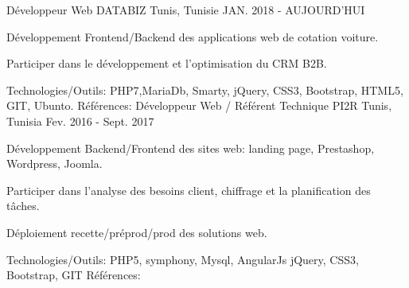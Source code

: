 \begin{cventries}
  \techentries
    {Développeur Web}
    {DATABIZ}
    {Tunis, Tunisie}
    {JAN. 2018 - AUJOURD'HUI}
    {
      \begin{cvitems}
		    \item {Développement Frontend/Backend des applications web de cotation voiture.}		
		    \item {Participer dans le développement et l'optimisation du CRM B2B.}
      \end{cvitems}
    }
    {\textcolor{awesome}{Technologies/Outils: } {\color{graytext}}  {PHP7,MariaDb, Smarty, jQuery, CSS3, Bootstrap, HTML5, GIT, Ubunto.}}
    {Références:} 
    {\href{https://www.reprise-citroen.fr//}{} \break
     \href{https://www.reprise-cash-bypeugeot.fr/}{} \break
     \href{https://www.reprise.dsautomobiles.fr/}{}\break
     \href{https://ankaufservice.renault.de/}{}\break
    }
  \techentries
    {Développeur Web / Référent Technique}
    {PI2R}
    {Tunis, Tunisia}
    {Fev. 2016 - Sept. 2017}
    {
      \begin{cvitems}
        \item {Développement Backend/Frontend des sites web: landing page, Prestashop, Wordpress, Joomla.}
        \item {Participer dans l'analyse des besoins client, chiffrage et la planification des tâches.}
        \item {Déploiement recette/préprod/prod des solutions web.}
      \end{cvitems}
    }
    {\textcolor{awesome}{Technologies/Outils: } {\color{graytext}}  {PHP5, symphony, Mysql, AngularJs jQuery, CSS3, Bootstrap, GIT}}
    {Références:} 
    {\href{http://www.tuttosport.tn/}{} \break
    \href{http://www.milddream.com/fr/ }{} \break
    \href{https://www.tvsoftconsult.com/ }{} \break
}
\end{cventries}
